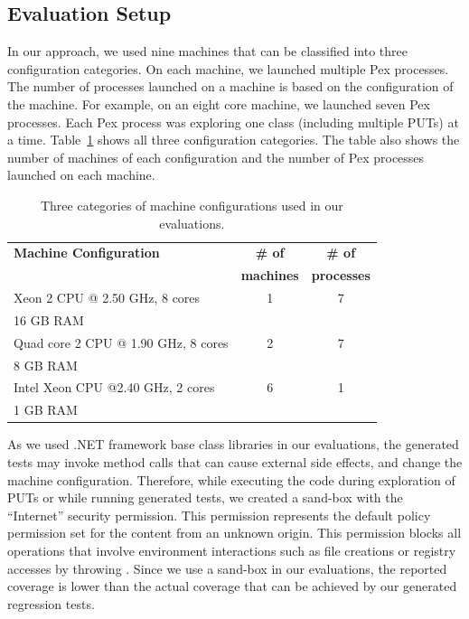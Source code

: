 \subsection{Evaluation Setup}

In our approach, we used nine machines that can be classified into three configuration categories. On each machine, we launched multiple Pex processes. The number of processes launched on a machine is based on the configuration of the machine. For example, on an eight core machine, we launched seven Pex processes. Each Pex process was exploring one class (including multiple PUTs) at a time. Table~\ref{tab:mconfig} shows all three configuration categories. The table also shows the number of machines of each configuration and the number of Pex processes launched on each machine.

\setlength{\tabcolsep}{1pt}
\begin{table}[t]
\begin{SmallOut}
\begin{CodeOut}
\begin{center}
\begin {tabular} {|l|c|c|}
\hline
\textbf{Machine Configuration} & \textbf{\# of} & \textbf{\# of} \\  
 & \textbf{machines} & \textbf{processes}\\  
\hline
\hline  Xeon 2 CPU @ 2.50 GHz, 8 cores & 1 & 7\\
				16 GB RAM & & \\
\hline  Quad core 2 CPU @ 1.90 GHz, 8 cores& 2 & 7\\
				8 GB RAM & & \\
\hline  Intel Xeon CPU @2.40 GHz, 2 cores& 6 & 1\\
				1 GB RAM & & \\
\hline
\end{tabular}
\end{center}
\end{CodeOut}
\end{SmallOut}\vspace*{-4ex}
\centering \caption {\label{tab:mconfig}Three categories of machine configurations used in our evaluations.}
\end{table}

As we used .NET framework base class libraries in our evaluations, the generated tests may invoke method calls that can cause external side effects, and change the machine configuration. Therefore, while executing the code during exploration of PUTs or while running generated tests, we created a sand-box with the ``Internet'' security permission. This permission represents the default policy permission set for the content from an unknown origin. This permission blocks all operations that involve environment interactions such as file creations or registry accesses by throwing . Since we use a sand-box in our evaluations, the reported coverage is lower than the actual coverage that can be achieved by our generated regression tests.

